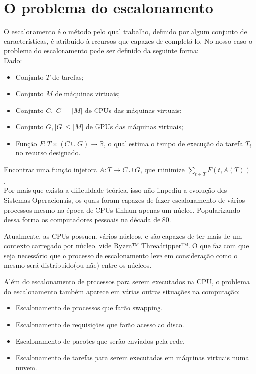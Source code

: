 
\section{O problema do escalonamento}

O escalonamento é o método pelo qual trabalho, definido por algum conjunto de características, é atribuído à recursos que capazes de completá-lo. No nosso caso o problema do escalonamento pode ser definido da seguinte forma:\\
Dado:
\begin{itemize}
	\item Conjunto $T$ de tarefas;
	\item Conjunto $M$ de máquinas virtuais;
	\item Conjunto $C, |C| = |M|$ de CPUs das máquinas virtuais;
	\item Conjunto $G,  |G| \le |M|$ de GPUs das máquinas virtuais;
	\item Função $F: T \times (C \cup G) \to \mathbb{R}$, o qual estima o tempo de execução da tarefa $T_{i}$ no recurso designado.
\end{itemize}
Encontrar uma função injetora $A: T \to C \cup G$, que minimize $\sum_{t \in T} F(t, A(T) )$.\\

Por mais que exista a dificuldade teórica\cite{ULLMAN1975384}, isso não impediu a evolução dos Sistemas Operacionais, os quais foram capazes de fazer escalonamento de vários processos mesmo na época de \acrfull{CPU}s tinham apenas um núcleo. Popularizando dessa forma os computadores pessoais na década de 80.

Atualmente, as \acrshort{CPU}s possuem vários núcleos, e são capazes de ter mais de um contexto carregado por núcleo, vide Ryzen™ Threadripper™\cite{Ryzen}. O que faz com que seja necessário que o processo de escalonamento leve em consideração como o mesmo será distribuído(ou não) entre os núcleos.

Além do escalonamento de processos para serem executados na \acrshort{CPU}, o problema do escalonamento também aparece em várias outras situações na computação:

\begin{itemize}
	\item Escalonamento de processos que farão swapping.
	\item Escalonamento de requisições que farão acesso ao disco.
	\item Escalonamento de pacotes que serão enviados pela rede.
	\item Escalonamento de tarefas para serem executadas em máquinas virtuais numa nuvem.
\end{itemize}

